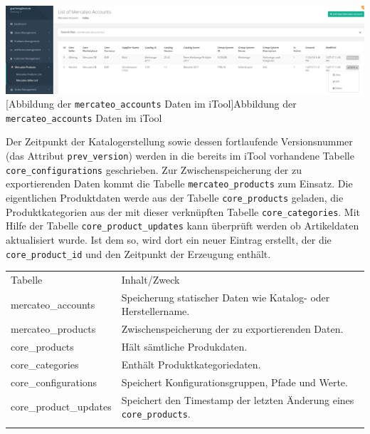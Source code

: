	\begin{minipage}{\linewidth}
		\vspace{1em}
		\centering
		\includegraphics[width=1 \linewidth]{img/iToolSeller}
		[Abbildung der \texttt{mercateo\_accounts} Daten im iTool]{Abbildung der \texttt{mercateo\_accounts} Daten im iTool}
		\vspace{1em}
	\end{minipage}
	
	 Der Zeitpunkt der Katalogerstellung sowie dessen fortlaufende Versionsnummer (das Attribut \texttt{prev\_version}) werden in die bereits im iTool vorhandene Tabelle \texttt{core\_configurations} geschrieben. Zur Zwischenspeicherung der zu exportierenden Daten kommt die Tabelle \texttt{mercateo\_products} zum Einsatz. Die eigentlichen Produktdaten werde aus der Tabelle \texttt{core\_products} geladen, die Produktkategorien aus der mit dieser verknüpften Tabelle \texttt{core\_categories}. Mit Hilfe der Tabelle \texttt{core\_product\_updates} kann überprüft werden ob Artikeldaten aktualisiert wurde. Ist dem so, wird dort ein neuer Eintrag erstellt, der die \texttt{core\_product\_id} und den Zeitpunkt der Erzeugung enthält.
	

	
	
	\begin{table}[!htbp]
		\begin{tabularx}{\textwidth}{p{3.8cm} X  }
			\rowcolor[HTML]{EFEFEF} 
			Tabelle & Inhalt/Zweck  \\ \cline{1-2} \addlinespace[7pt]
			mercateo\_accounts & Speicherung statischer Daten wie Katalog- oder Herstellername. \\
			mercateo\_products & Zwischenspeicherung der zu exportierenden Daten.  \\
			core\_products & Hält sämtliche Produkdaten. \\
			core\_categories & Enthält Produktkategoriedaten. \\
			core\_configurations & Speichert Konfigurationsgruppen, Pfade und Werte. \\ 
			core\_product\_updates & Speichert den Timestamp der letzten Änderung eines \texttt{core\_products}. \\ \addlinespace[7pt] \cline{1-2} 	
	
		\end{tabularx}%
	\end{table}
		
